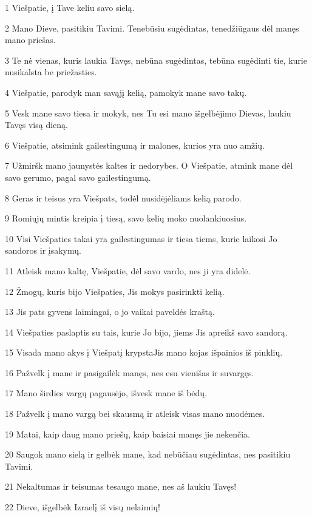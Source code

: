 \par 1 Viešpatie, į Tave keliu savo sielą. 
\par 2 Mano Dieve, pasitikiu Tavimi. Tenebūsiu sugėdintas, tenedžiūgaus dėl manęs mano priešas. 
\par 3 Te nė vienas, kuris laukia Tavęs, nebūna sugėdintas, tebūna sugėdinti tie, kurie nusikalsta be priežasties. 
\par 4 Viešpatie, parodyk man savąjį kelią, pamokyk mane savo takų. 
\par 5 Vesk mane savo tiesa ir mokyk, nes Tu esi mano išgelbėjimo Dievas, laukiu Tavęs visą dieną. 
\par 6 Viešpatie, atsimink gailestingumą ir malones, kurios yra nuo amžių. 
\par 7 Užmiršk mano jaunystės kaltes ir nedorybes. O Viešpatie, atmink mane dėl savo gerumo, pagal savo gailestingumą. 
\par 8 Geras ir teisus yra Viešpats, todėl nusidėjėliams kelią parodo. 
\par 9 Romiųjų mintis kreipia į tiesą, savo kelių moko nuolankiuosius. 
\par 10 Visi Viešpaties takai yra gailestingumas ir tiesa tiems, kurie laikosi Jo sandoros ir įsakymų. 
\par 11 Atleisk mano kaltę, Viešpatie, dėl savo vardo, nes ji yra didelė. 
\par 12 Žmogų, kuris bijo Viešpaties, Jis mokys pasirinkti kelią. 
\par 13 Jis pats gyvens laimingai, o jo vaikai paveldės kraštą. 
\par 14 Viešpaties paslaptis su tais, kurie Jo bijo, jiems Jis apreikš savo sandorą. 
\par 15 Visada mano akys į Viešpatį krypsta­Jis mano kojas išpainios iš pinklių. 
\par 16 Pažvelk į mane ir pasigailėk manęs, nes esu vienišas ir suvargęs. 
\par 17 Mano širdies vargų pagausėjo, išvesk mane iš bėdų. 
\par 18 Pažvelk į mano vargą bei skausmą ir atleisk visas mano nuodėmes. 
\par 19 Matai, kaip daug mano priešų, kaip baisiai manęs jie nekenčia. 
\par 20 Saugok mano sielą ir gelbėk mane, kad nebūčiau sugėdintas, nes pasitikiu Tavimi. 
\par 21 Nekaltumas ir teisumas tesaugo mane, nes aš laukiu Tavęs! 
\par 22 Dieve, išgelbėk Izraelį iš visų nelaimių!



